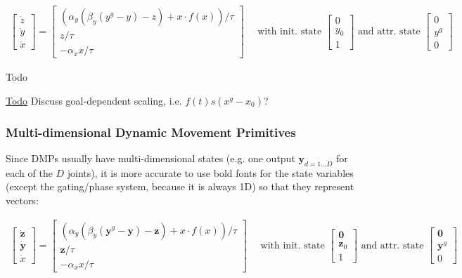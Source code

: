 \begin{eqnarray*} \left[ \begin{array}{l} {\dot{z}} \\ {\dot{y}} \\ {\dot{x}} \end{array} \right] = \left[ \begin{array}{l} (\alpha_y (\beta_y({y}^{g}-{y})-{z}) + x\cdot f(x))/\tau \\ {z}/\tau \\ -\alpha_x x/\tau \end{array} \right] \mbox{~~~~with init. state~} \left[ \begin{array}{l} 0 \\ y_0 \\ 1 \end{array} \right] \mbox{~and attr. state~} \left[ \begin{array}{l} {0} \\ {y}^g \\ 0 \end{array} \right] \end{eqnarray*}

\begin{DoxyRefDesc}{Todo}
\item[\hyperlink{todo__todo000006}{Todo}]Discuss goal-\/dependent scaling, i.\+e. $ f(t)s(x^g-x_0) $?\end{DoxyRefDesc}
\hypertarget{page_dmp_sec_multidim_dmp}{}\subsubsection{Multi-\/dimensional Dynamic Movement Primitives}\label{page_dmp_sec_multidim_dmp}
Since D\+M\+Ps usually have multi-\/dimensional states (e.\+g. one output $ {\mathbf{y}}_{d=1\dots D}$ for each of the $ D $ joints), it is more accurate to use bold fonts for the state variables (except the gating/phase system, because it is always 1\+D) so that they represent vectors\+:

\begin{eqnarray*} \left[ \begin{array}{l} {\dot{\mathbf{z}}} \\ {\dot{\mathbf{y}}} \\ {\dot{x}} \end{array} \right] = \left[ \begin{array}{l} (\alpha_y (\beta_y({\mathbf{y}}^{g}-\mathbf{y})-\mathbf{z}) + x\cdot f(x))/\tau \\ \mathbf{z}/\tau \\ -\alpha_x x/\tau \end{array} \right] \mbox{~~~~with init. state~} \left[ \begin{array}{l} \mathbf{0} \\ \mathbf{z}_0 \\ 1 \end{array} \right] \mbox{~and attr. state~} \left[ \begin{array}{l} \mathbf{0} \\ \mathbf{y}^g \\ 0 \end{array} \right] \end{eqnarray*}

